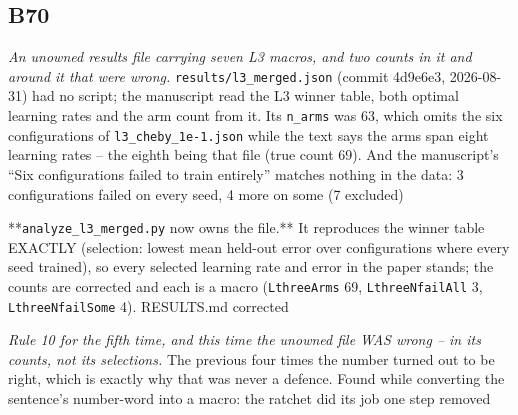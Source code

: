 \documentclass[10pt]{article}
\begin{document}
\subsection*{B70}\label{led:B70}
\begin{description}[leftmargin=0pt,itemsep=1pt]
\item[Defect.] \emph{An unowned results file carrying seven L3 macros, and two counts in it and around it that were wrong.} \texttt{results/l3\_merged.json} (commit 4d9e6e3, 2026-08-31) had no script; the manuscript read the L3 winner table, both optimal learning rates and the arm count from it. Its \texttt{n\_arms} was 63, which omits the six configurations of \texttt{l3\_cheby\_1e-1.json} while the text says the arms span eight learning rates -- the eighth being that file (true count 69). And the manuscript's ``Six configurations failed to train entirely'' matches nothing in the data: 3 configurations failed on every seed, 4 more on some (7 excluded)
\item[Resolution.] **\texttt{analyze\_l3\_merged.py} now owns the file.** It reproduces the winner table EXACTLY (selection: lowest mean held-out error over configurations where every seed trained), so every selected learning rate and error in the paper stands; the counts are corrected and each is a macro (\texttt{LthreeArms} 69, \texttt{LthreeNfailAll} 3, \texttt{LthreeNfailSome} 4). RESULTS.md corrected
\item[Note.] \emph{Rule 10 for the fifth time, and this time the unowned file WAS wrong -- in its counts, not its selections.} The previous four times the number turned out to be right, which is exactly why that was never a defence. Found while converting the sentence's number-word into a macro: the ratchet did its job one step removed
\end{description}
\end{document}
